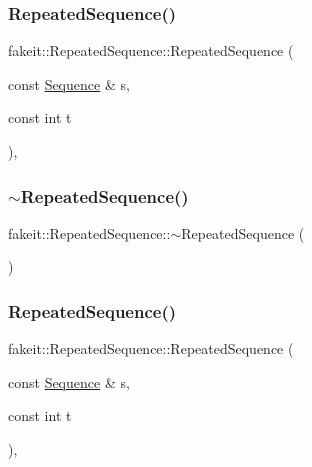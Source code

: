 \subsubsection{\texorpdfstring{RepeatedSequence()}{RepeatedSequence()}\hspace{0.1cm}{\footnotesize\ttfamily [7/9]}}
{\footnotesize\ttfamily fakeit\+::\+Repeated\+Sequence\+::\+Repeated\+Sequence (\begin{DoxyParamCaption}\item[{const \mbox{\hyperlink{classfakeit_1_1Sequence}{Sequence}} \&}]{s,  }\item[{const int}]{t }\end{DoxyParamCaption})\hspace{0.3cm}{\ttfamily [inline]}, {\ttfamily [protected]}}

\mbox{\label{classfakeit_1_1RepeatedSequence_aa45714780e496cf02e8e35f27de5b617}} 
\subsubsection{\texorpdfstring{$\sim$RepeatedSequence()}{~RepeatedSequence()}\hspace{0.1cm}{\footnotesize\ttfamily [7/9]}}
{\footnotesize\ttfamily fakeit\+::\+Repeated\+Sequence\+::$\sim$\+Repeated\+Sequence (\begin{DoxyParamCaption}{ }\end{DoxyParamCaption})\hspace{0.3cm}{\ttfamily [inline]}}

\mbox{\label{classfakeit_1_1RepeatedSequence_ac83fde9f96aa63322c82ffd44ff33a75}} 
\subsubsection{\texorpdfstring{RepeatedSequence()}{RepeatedSequence()}\hspace{0.1cm}{\footnotesize\ttfamily [8/9]}}
{\footnotesize\ttfamily fakeit\+::\+Repeated\+Sequence\+::\+Repeated\+Sequence (\begin{DoxyParamCaption}\item[{const \mbox{\hyperlink{classfakeit_1_1Sequence}{Sequence}} \&}]{s,  }\item[{const int}]{t }\end{DoxyParamCaption})\hspace{0.3cm}{\ttfamily [inline]}, {\ttfamily [protected]}}

